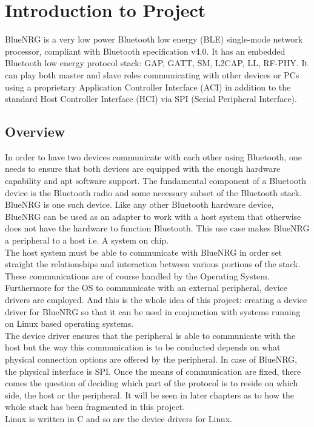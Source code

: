 \chapter{Introduction to Project}
\noindent BlueNRG is a very low power Bluetooth low energy (BLE) single-mode network processor, compliant with Bluetooth specification v4.0. It has an embedded Bluetooth low energy protocol stack: GAP, GATT, SM, L2CAP, LL, RF-PHY. It can play both master and slave roles communicating with other devices or PCs using a proprietary Application Controller Interface (ACI) in addition to the standard Host Controller Interface (HCI) via SPI (Serial Peripheral Interface). 
\section{Overview}
\noindent In order to have two devices communicate with each other using Bluetooth, one needs to ensure that both devices are equipped with the enough hardware capability and apt software support. The fundamental component of a Bluetooth device is the Bluetooth radio and some necessary subset of the Bluetooth stack. BlueNRG is one such device. Like any other Bluetooth hardware device, BlueNRG can be used as an adapter to work with a host system that otherwise does not have the hardware to function Bluetooth. This use case makes BlueNRG a peripheral to a host i.e. A system on chip. \\
\noindent The host system must be able to communicate with BlueNRG in order set straight the relationships and interaction between various portions of the stack. These communications are of course handled by the Operating System. Furthermore for the OS to communicate with an external peripheral, device drivers are employed. And this is the whole idea of this project: creating a device driver for BlueNRG so that it can be used in conjunction with systems running on Linux based operating systems.\\
\noindent The device driver ensures that the peripheral is able to communicate with the host but the way this communication is to be conducted depends on what physical connection options are offered by the peripheral. In case of BlueNRG, the physical interface is SPI. Once the means of communication are fixed, there comes the question of deciding which part of the protocol is to reside on which side, the host or the peripheral. It will be seen in later chapters as to how the whole stack has been fragmented in this project.\\
\noindent Linux is written in C and so are the device drivers for Linux.
